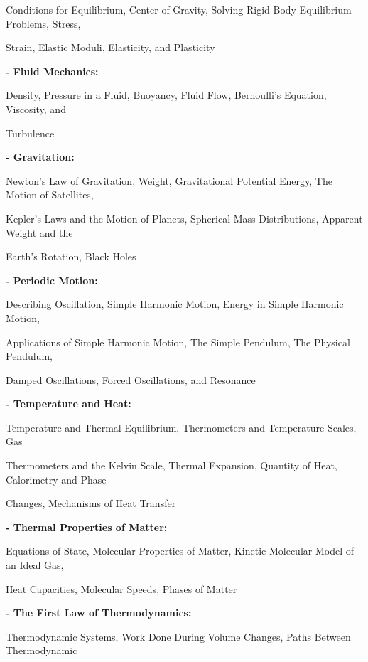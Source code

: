 \documentclass[12pt,a4paper]{article}
\begin{document}
Conditions for Equilibrium, Center of Gravity, Solving Rigid-Body Equilibrium Problems, Stress,\par
Strain, Elastic Moduli, Elasticity, and Plasticity\par
\vspace{2pt}\textbf{- Fluid Mechanics:}\par
Density, Pressure in a Fluid, Buoyancy, Fluid Flow, Bernoulli’s Equation, Viscosity, and\par
Turbulence\par
\vspace{2pt}\textbf{- Gravitation:}\par
Newton’s Law of Gravitation, Weight, Gravitational Potential Energy, The Motion of Satellites,\par
Kepler’s Laws and the Motion of Planets, Spherical Mass Distributions, Apparent Weight and the\par
Earth’s Rotation, Black Holes\par
\vspace{2pt}\textbf{- Periodic Motion:}\par
Describing Oscillation, Simple Harmonic Motion, Energy in Simple Harmonic Motion,\par
Applications of Simple Harmonic Motion, The Simple Pendulum, The Physical Pendulum,\par
Damped Oscillations, Forced Oscillations, and Resonance\par
\vspace{2pt}\textbf{- Temperature and Heat:}\par
Temperature and Thermal Equilibrium, Thermometers and Temperature Scales, Gas\par
Thermometers and the Kelvin Scale, Thermal Expansion, Quantity of Heat, Calorimetry and Phase\par
Changes, Mechanisms of Heat Transfer\par
\vspace{2pt}\textbf{- Thermal Properties of Matter:}\par
Equations of State, Molecular Properties of Matter, Kinetic-Molecular Model of an Ideal Gas,\par
Heat Capacities, Molecular Speeds, Phases of Matter\par
\vspace{2pt}\textbf{- The First Law of Thermodynamics:}\par
Thermodynamic Systems, Work Done During Volume Changes, Paths Between Thermodynamic\par
\end{document}
